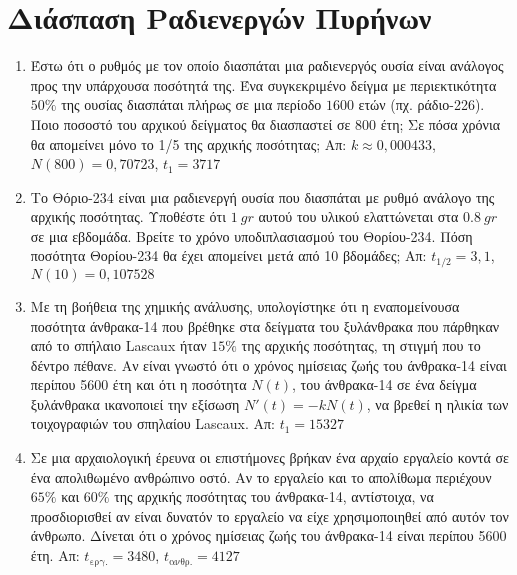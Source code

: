 \section*{Διάσπαση Ραδιενεργών Πυρήνων}

\begin{enumerate}
  \item Έστω ότι ο ρυθμός με τον οποίο διασπάται μια ραδιενεργός ουσία είναι ανάλογος 
    προς την υπάρχουσα ποσότητά της. Ένα συγκεκριμένο δείγμα με περιεκτικότητα $ 50 \% $ 
    της ουσίας διασπάται πλήρως σε μια περίοδο $ 1600 $ ετών (πχ. ράδιο-226). Ποιο 
    ποσοστό του αρχικού δείγματος θα διασπαστεί σε $ 800 $ έτη; Σε πόσα χρόνια 
    θα απομείνει μόνο το 1/5 της αρχικής ποσότητας; 
    \hfill Απ: $ k\approx 0,000433 $, $ N(800) = 0,70723 $, $ t_{1}=3717 $ 


  \item Το Θόριο-234 είναι μια ραδιενεργή ουσία που διασπάται με ρυθμό ανάλογο της 
    αρχικής ποσότητας. Υποθέστε ότι $ \SI{1}{gr} $ αυτού του υλικού ελαττώνεται στα 
    $ \SI{0,8}{gr} $ σε μια εβδομάδα. Βρείτε το χρόνο υποδιπλασιασμού του Θορίου-234. 
    Πόση ποσότητα Θορίου-234 θα έχει απομείνει μετά από 10 βδομάδες;
    \hfill Απ: $ t_{1/2} = 3,1$, $ N(10)=0,107528 $  

  \item Με τη βοήθεια της χημικής ανάλυσης, υπολογίστηκε ότι η εναπομείνουσα ποσότητα 
    άνθρακα-14 που βρέθηκε στα δείγματα του ξυλάνθρακα που πάρθηκαν από το σπήλαιο 
    Lascaux ήταν $ 15 \% $ της αρχικής ποσότητας, τη στιγμή που το δέντρο πέθανε. Αν 
    είναι γνωστό ότι ο χρόνος ημίσειας ζωής του άνθρακα-14 είναι περίπου 5600 έτη και 
    ότι η ποσότητα $ N(t) $, του άνθρακα-14 σε ένα δείγμα ξυλάνθρακα ικανοποιεί την 
    εξίσωση $ N'(t)=-kN(t) $, να βρεθεί η ηλικία των τοιχογραφιών του σπηλαίου Lascaux.
    \hfill Απ: $ t_{1} = 15327 $ 

  \item Σε μια αρχαιολογική έρευνα οι επιστήμονες βρήκαν ένα αρχαίο εργαλείο κοντά 
    σε ένα απολιθωμένο ανθρώπινο οστό. Αν το εργαλείο και το απολίθωμα περιέχουν 
    $ 65 \% $ και $ 60 \% $ της αρχικής ποσότητας του άνθρακα-14, αντίστοιχα, 
    να προσδιορισθεί αν είναι δυνατόν το εργαλείο να είχε χρησιμοποιηθεί από αυτόν 
    τον άνθρωπο.  Δίνεται ότι ο χρόνος ημίσειας ζωής του άνθρακα-14 είναι περίπου 
    5600 έτη.  
    \hfill Απ: $ t_{\text{εργ.}} = 3480 $, $ t_{\text{ανθρ.}} = 4127 $  

\end{enumerate}


